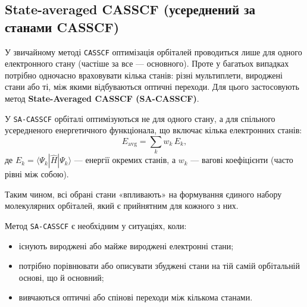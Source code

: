 %
%
%
%



\subsection{State-averaged CASSCF (усереднений за станами CASSCF)}

У звичайному методі \texttt{CASSCF} оптимізація орбіталей проводиться лише
для одного електронного стану (частіше за все --- основного). Проте у багатьох
випадках потрібно одночасно враховувати кілька станів: різні мультиплети,
вироджені стани або ті, між якими відбуваються оптичні переходи.
Для цього застосовують метод \textbf{State-Averaged CASSCF (SA-CASSCF)}.

У \texttt{SA-CASSCF} орбіталі оптимізуються не для одного стану, а для спільного
усередненого енергетичного функціонала, що включає кілька електронних станів:
\[
E_{\text{avg}} = \sum_k w_k \, E_k,
\]
де \(E_k = \langle \Psi_k | \hat{H} | \Psi_k \rangle\) --- енергії окремих станів,
а \(w_k\) --- вагові коефіцієнти (часто рівні між собою).

Таким чином, всі обрані стани «впливають» на формування єдиного набору
молекулярних орбіталей, який є прийнятним для кожного з них.

Метод \texttt{SA-CASSCF} є необхідним у ситуаціях, коли:
\begin{itemize}
  \item існують вироджені або майже вироджені електронні стани;
  \item потрібно порівнювати або описувати збуджені стани на тій самій
        орбітальній основі, що й основний;
  \item вивчаються оптичні або спінові переходи між кількома станами.
\end{itemize}

